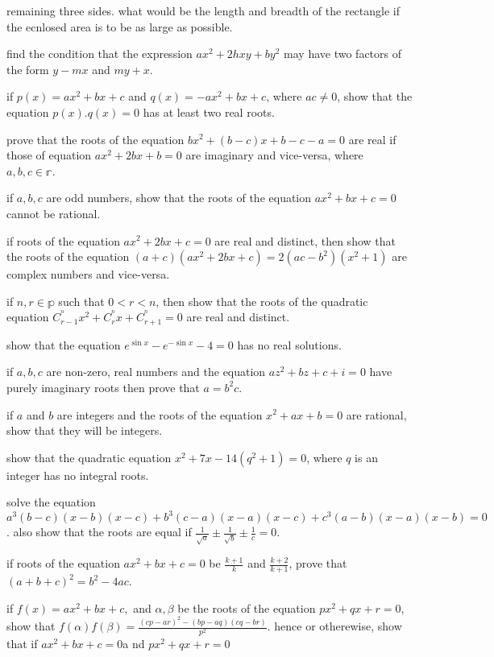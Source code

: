   remaining three sides. what would be the length and breadth of the rectangle if the ecnlosed area is to be as large as possible.
\item find the condition that the expression $ax^2 + 2hxy + by^2$ may have two factors of the form $y - mx$ and $my + x$.
\item if $p(x) = ax^2 + bx + c$ and $q(x) = - ax^2 + bx + c$, where $ac\neq 0$, show that the equation $p(x).q(x) = 0$ has at least
  two real roots.
\item prove that the roots of the equation $bx^2 + (b - c)x + b - c - a = 0$ are real if those of equation $ax^2 + 2bx + b = 0$ are
  imaginary and vice-versa, where $a, b, c\in\mathbb{r}$.
\item if $a, b, c$ are odd numbers, show that the roots of the equation $ax^2 + bx + c = 0$ cannot be rational.
\item if roots of the equation $ax^2 + 2bx + c = 0$ are real and distinct, then show that the roots of the equation $(a + c)(ax^2 +
  2bx + c) = 2(ac - b^2)(x^2 + 1)$ are complex numbers and vice-versa.
\item if $n, r\in\mathbb{p}$ such that $0 < r < n$, then show that the roots of the quadratic equation $C_{r - 1}^^nx^2 + C_r^^nx
  + C_{r + 1}^^n = 0$ are real and distinct.
\item show that the equation $e^{\sin x} - e^{-\sin x} - 4 = 0$ has no real solutions.
\item if $a, b, c$ are non-zero, real numbers and the equation $az^2 + bz + c + i = 0$ have purely imaginary roots then prove that
  $a = b^2c$.
\item if $a$ and $b$ are integers and the roots of the equation $x^2 + ax + b = 0$ are rational, show that they will be integers.
\item show that the quadratic equation $x^2 + 7x - 14(q^2 + 1) = 0$, where $q$ is an integer has no integral roots.
\item solve the equation $a^3(b - c)(x - b)(x - c) + b^3(c - a)(x - a)(x - c) + c^3(a - b)(x - a)(x - b) = 0$. also show that the
  roots are equal if $\frac{1}{\sqrt{a}}\pm \frac{1}{\sqrt{b}}\pm \frac{1}{c} = 0$.
\item if roots of the equation $ax^2 + bx + c = 0$ be $\frac{k + 1}{k}$ and $\frac{k + 2}{k + 1}$, prove that $(a + b + c)^2 = b^2
  - 4ac$.
\item if $f(x) = ax^2 + bx + c,$ and $\alpha, \beta$ be the roots of the equation $px^2 + qx + r = 0$, show that $f(\alpha)f(\beta)
  = \frac{(cp - ar)^2 - (bp - aq)(cq - br)}{p^2}$. hence or otherewise, show that if $ax^2 + bx + c  = 0$a nd $px^2 + qx + r = 0$
